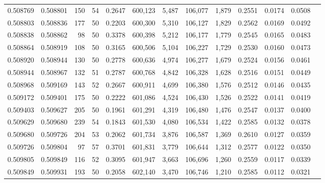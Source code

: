 \begin{tabular}{rrrrrrrrrrrrr}
0.508769 & 0.508801 & 150 &  54 &                                     0.2647 & 600,123 &   5,487 & 106,077 &   1,879 & 0.2551 & 0.0174 & 0.0508 \\
0.508803 & 0.508836 & 177 &  50 &                                     0.2203 & 600,300 &   5,310 & 106,127 &   1,829 & 0.2562 & 0.0169 & 0.0492 \\
0.508838 & 0.508862 &  98 &  50 &                                     0.3378 & 600,398 &   5,212 & 106,177 &   1,779 & 0.2545 & 0.0165 & 0.0483 \\
0.508864 & 0.508919 & 108 &  50 &                                     0.3165 & 600,506 &   5,104 & 106,227 &   1,729 & 0.2530 & 0.0160 & 0.0473 \\
0.508920 & 0.508944 & 130 &  50 &                                     0.2778 & 600,636 &   4,974 & 106,277 &   1,679 & 0.2524 & 0.0156 & 0.0461 \\
0.508944 & 0.508967 & 132 &  51 &                                     0.2787 & 600,768 &   4,842 & 106,328 &   1,628 & 0.2516 & 0.0151 & 0.0449 \\
0.508968 & 0.509169 & 143 &  52 &                                     0.2667 & 600,911 &   4,699 & 106,380 &   1,576 & 0.2512 & 0.0146 & 0.0435 \\
0.509172 & 0.509401 & 175 &  50 &                                     0.2222 & 601,086 &   4,524 & 106,430 &   1,526 & 0.2522 & 0.0141 & 0.0419 \\
0.509403 & 0.509627 & 205 &  50 &                                     0.1961 & 601,291 &   4,319 & 106,480 &   1,476 & 0.2547 & 0.0137 & 0.0400 \\
0.509629 & 0.509680 & 239 &  54 &                                     0.1843 & 601,530 &   4,080 & 106,534 &   1,422 & 0.2585 & 0.0132 & 0.0378 \\
0.509680 & 0.509726 & 204 &  53 &                                     0.2062 & 601,734 &   3,876 & 106,587 &   1,369 & 0.2610 & 0.0127 & 0.0359 \\
0.509726 & 0.509804 &  97 &  57 &                                     0.3701 & 601,831 &   3,779 & 106,644 &   1,312 & 0.2577 & 0.0122 & 0.0350 \\
0.509805 & 0.509849 & 116 &  52 &                                     0.3095 & 601,947 &   3,663 & 106,696 &   1,260 & 0.2559 & 0.0117 & 0.0339 \\
0.509849 & 0.509931 & 193 &  50 &                                     0.2058 & 602,140 &   3,470 & 106,746 &   1,210 & 0.2585 & 0.0112 & 0.0321 \\

\end{tabular}
